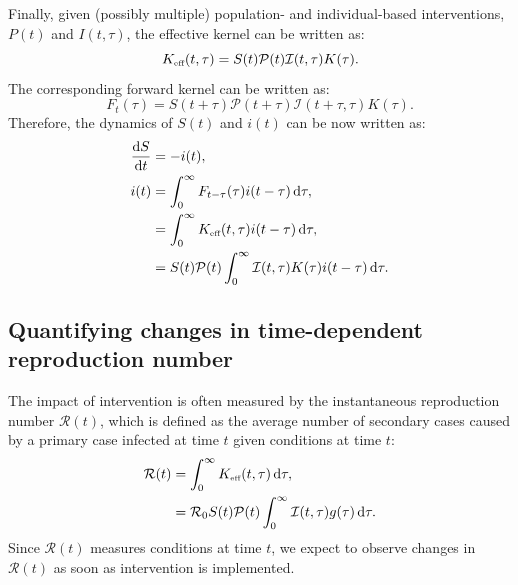 \documentclass[12pt]{article}
\newcommand{\RR}{\ensuremath{{\mathcal R}}\xspace}
\newcommand{\tsub}[2]{#1_{{\textrm{\tiny #2}}}}
\newcommand{\dd}[1]{\ensuremath{\, \mathrm{d}#1}}
\newcommand{\dtau}{\dd{\tau}}
\newcommand{\Keff}{\ensuremath{\tsub{K}{eff}}\xspace}
\newcommand{\PP}{{\mathcal P}}
\newcommand{\II}{{\mathcal I}}
\begin{document}
Finally, given (possibly multiple) population- and individual-based interventions, $P(t)$ and $I(t, \tau)$, the effective kernel can be written as:
\begin{equation}
\Keff(t, \tau) = S(t) \PP(t) \II(t,\tau) K(\tau).
\end{equation}
The corresponding forward kernel can be written as:
\begin{equation}
F_t(\tau) = S(t+\tau) \PP(t + \tau) \II(t+\tau, \tau) K(\tau).
\end{equation}
Therefore, the dynamics of $S(t)$ and $i(t)$ can be now written as:
\begin{equation}
\begin{aligned}
\frac{\mathrm{d}S}{\mathrm{d}t} &= - i(t),\\
i(t) &= \int_0^\infty F_{t-\tau}(\tau) i(t-\tau) \dtau,\\
&=\int_0^\infty  \Keff(t,\tau) i(t-\tau)\dtau,\\
&= S(t) \PP(t) \int_0^\infty \II(t, \tau) K(\tau) i(t-\tau)\dtau.
\label{eq:renewal}
\end{aligned}
\end{equation}

\subsection{Quantifying changes in time-dependent reproduction number}

The impact of intervention is often measured by the instantaneous reproduction number $\RR(t)$, which is defined as the average number of secondary cases caused by a primary case infected at time $t$ given conditions at time $t$:
\begin{align}
\RR(t) &= \int_0^\infty \Keff(t, \tau) \dtau,\\
&= \RR_0 S(t) \PP(t) \int_0^\infty \II(t,\tau) g(\tau) \dtau.
\label{eq:rt}
\end{align}
Since $\RR(t)$ measures conditions at time $t$, we expect to observe changes in $\RR(t)$ as soon as intervention is implemented.
\end{document}
